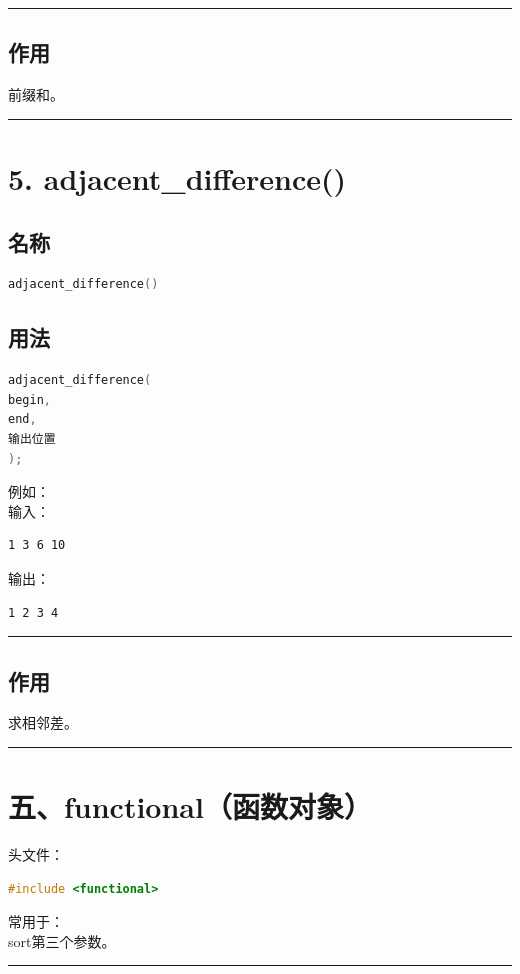 \documentclass[9pt,twocolumn]{extarticle}
\begin{document}
\noindent\rule{\linewidth}{0.4pt}

\subsection{作用}
前缀和。

\noindent\rule{\linewidth}{0.4pt}

\section{5. adjacent\_difference()}

\subsection{名称}
\begin{lstlisting}[language=C++]
adjacent_difference()
\end{lstlisting}

\subsection{用法}
\begin{lstlisting}[language=C++]
adjacent_difference(
begin,
end,
输出位置
);
\end{lstlisting}
例如：\\
输入：
\begin{lstlisting}
1 3 6 10
\end{lstlisting}
输出：
\begin{lstlisting}
1 2 3 4
\end{lstlisting}

\noindent\rule{\linewidth}{0.4pt}

\subsection{作用}
求相邻差。

\noindent\rule{\linewidth}{0.4pt}

\section{五、functional（函数对象）}

头文件：
\begin{lstlisting}[language=C++]
#include <functional>
\end{lstlisting}
常用于：\\
sort第三个参数。

\noindent\rule{\linewidth}{0.4pt}
\end{document}
